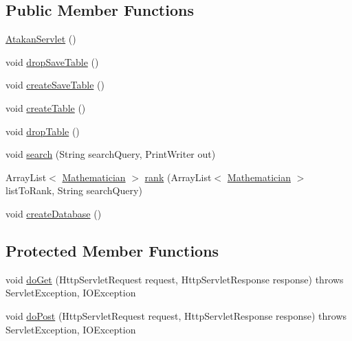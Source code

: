 \subsection*{Public Member Functions}
\begin{DoxyCompactItemize}
\item 
\hyperlink{classcom_1_1example_1_1servlets_1_1_atakan_servlet_a87e2532962ccd888df5a6e642ab6c047}{Atakan\+Servlet} ()
\item 
void \hyperlink{classcom_1_1example_1_1servlets_1_1_atakan_servlet_a6e8d25b648ac5982a2841efc984554f0}{drop\+Save\+Table} ()
\item 
void \hyperlink{classcom_1_1example_1_1servlets_1_1_atakan_servlet_a35d1a337e700fae93e6c1bc1e8caa3be}{create\+Save\+Table} ()
\item 
void \hyperlink{classcom_1_1example_1_1servlets_1_1_atakan_servlet_a58d74748199c3d7e4c4fc4a4dc4a4a9e}{create\+Table} ()
\item 
void \hyperlink{classcom_1_1example_1_1servlets_1_1_atakan_servlet_a8d4a40b18eb4548d16c072701c7eae16}{drop\+Table} ()
\item 
void \hyperlink{classcom_1_1example_1_1servlets_1_1_atakan_servlet_a12f494a4d42fef16831bba384424cba5}{search} (String search\+Query, Print\+Writer out)
\item 
Array\+List$<$ \hyperlink{classcom_1_1example_1_1servlets_1_1_atakan_servlet_1_1_mathematician}{Mathematician} $>$ \hyperlink{classcom_1_1example_1_1servlets_1_1_atakan_servlet_a6669d1bb4530b4a39409c614752f237e}{rank} (Array\+List$<$ \hyperlink{classcom_1_1example_1_1servlets_1_1_atakan_servlet_1_1_mathematician}{Mathematician} $>$ list\+To\+Rank, String search\+Query)
\item 
void \hyperlink{classcom_1_1example_1_1servlets_1_1_atakan_servlet_ac43c5246ad7474fb542684e70b884f14}{create\+Database} ()
\end{DoxyCompactItemize}
\subsection*{Protected Member Functions}
\begin{DoxyCompactItemize}
\item 
void \hyperlink{classcom_1_1example_1_1servlets_1_1_atakan_servlet_a958df833cc34bf6033b56121d82459d1}{do\+Get} (Http\+Servlet\+Request request, Http\+Servlet\+Response response)  throws Servlet\+Exception, I\+O\+Exception 
\item 
void \hyperlink{classcom_1_1example_1_1servlets_1_1_atakan_servlet_ac40ca8b0badf1b9e4ef13f6ba72bf3b6}{do\+Post} (Http\+Servlet\+Request request, Http\+Servlet\+Response response)  throws Servlet\+Exception, I\+O\+Exception 
\end{DoxyCompactItemize}
